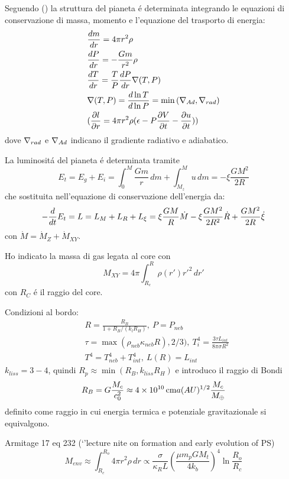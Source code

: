 Seguendo (\cite{mordasini2012characterization}) la struttura del pianeta \'e determinata integrando le equazioni di conservazione di massa, momento e l'equazione del trasporto di energia:
\begin{align}
&\TDy{r}{m}=4\pi r^2\rho\\
&\TDy{r}{P}=-\frac{Gm}{r^2}\rho\\
&\TDy{r}{T}=\frac{T}{P}\TDy{r}{P}\nabla(T,P)\\
&\nabla(T,P)=\TDly{P}{T}=\min{(\nad{},\nrad{})}\\
&(\PDy{r}{l}=4\pi r^2\rho(\epsilon-P\PDy{t}{V}-\PDy{t}{u}))
\end{align}
dove $\nrad{}$ e $\nad{}$ indicano il gradiente radiativo e adiabatico.

La luminosit\'a del pianeta \'e determinata tramite
\begin{equation}
E_t=E_g+E_i=\int_0^M\frac{Gm}{r}\,dm+\int_{M_z}^Mu\,dm=-\xi\frac{GM^2}{2R}
\end{equation}
che sostituita nell'equazione di conservazione dell'energia da:
\begin{equation}
-\TDof{t}E_t=L=L_M+L_R+L_{\xi}=\xi\frac{GM}{R}\dot{M}-\xi\frac{GM^2}{2R^2}\dot{R}+\frac{GM^2}{2R}\dot{\xi}
\end{equation}
con $\dot{M}=\dot{M}_Z+\dot{M}_{XY}$.

Ho indicato la massa di gas legata al core con
\begin{equation}
M_{XY}=4\pi\int_{R_c}^R\rho(r')r'^2\,dr'
\end{equation}
con $R_C$ \'e il raggio del core.

Condizioni al bordo:
\begin{align}
&R=\frac{R_B}{1+R_B/(k_lR_H )},\ P=P_{neb}\\
&\tau=\max{(\rho_{neb}\kappa_{neb}R),2/3)},\ T_i^4=\frac{3\tau L_{int}}{8\pi\sigma R^2}\\
&T^4=T_{neb}^4+T_{int}^4,\ L(R)=L_{int}
\end{align}
$k_{liss}=3-4$, quindi $R_p\approx \min{(R_B,k_{liss}R_H)}$ e introduco il raggio di Bondi
\begin{equation}
R_B=G\frac{M_c}{c_0^2}\approx\SI{4e10}{\cm}a(AU)\expy{1/2}\frac{M_c}{\mearth{}}
\end{equation}
definito come raggio in cui energia termica e potenziale gravitazionale si equivalgono.%

\begin{workout}
Armitage 17 eq 232 (`'lecture nite on formation and early evolution of PS)
\begin{equation}
M_{env}\approx\int_{R_c}^{R_o}4\pi r^2\rho\,dr\propto\frac{\sigma}{\kappa_RL}(\frac{\mu m_pGM_t}{4k_b})^4\ln{\frac{R_o}{R_c}}
\end{equation}
\end{workout}

